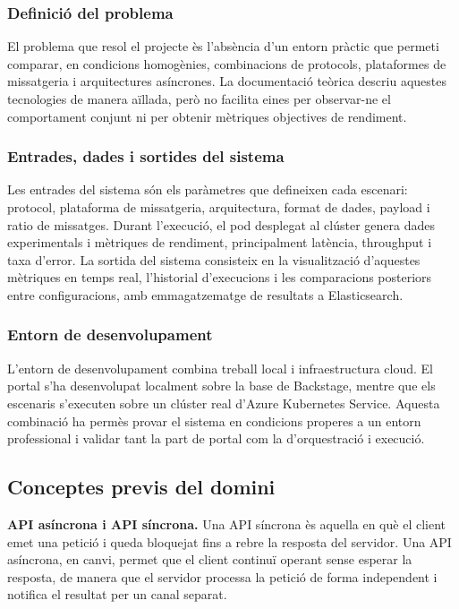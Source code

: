 \documentclass[11pt,a4paper]{article}
\begin{document}
\subsubsection{Definici\'o del problema}
El problema que resol el projecte \`es l'abs\`encia d'un entorn pr\`actic que permeti comparar, en condicions homog\`enies, combinacions de protocols, plataformes de missatgeria i arquitectures as\'incrones. La documentaci\'o te\`orica descriu aquestes tecnologies de manera a\"illada, per\`o no facilita eines per observar-ne el comportament conjunt ni per obtenir m\`etriques objectives de rendiment.

\subsubsection{Entrades, dades i sortides del sistema}
Les entrades del sistema s\'on els par\`ametres que defineixen cada escenari: protocol, plataforma de missatgeria, arquitectura, format de dades, payload i ratio de missatges. Durant l'execuci\'o, el pod desplegat al cl\'uster genera dades experimentals i m\`etriques de rendiment, principalment lat\`encia, throughput i taxa d'error. La sortida del sistema consisteix en la visualitzaci\'o d'aquestes m\`etriques en temps real, l'historial d'execucions i les comparacions posteriors entre configuracions, amb emmagatzematge de resultats a Elasticsearch.

\subsubsection{Entorn de desenvolupament}
L'entorn de desenvolupament combina treball local i infraestructura cloud. El portal s'ha desenvolupat localment sobre la base de Backstage, mentre que els escenaris s'executen sobre un cl\'uster real d'Azure Kubernetes Service. Aquesta combinaci\'o ha perm\`es provar el sistema en condicions properes a un entorn professional i validar tant la part de portal com la d'orquestraci\'o i execuci\'o.

\subsection{Conceptes previs del domini}
\textbf{API as\'incrona i API s\'incrona.} Una API s\'incrona \`es aquella en qu\`e el client emet una petici\'o i queda bloquejat fins a rebre la resposta del servidor. Una API as\'incrona, en canvi, permet que el client continu\"i operant sense esperar la resposta, de manera que el servidor processa la petici\'o de forma independent i notifica el resultat per un canal separat.
\end{document}
